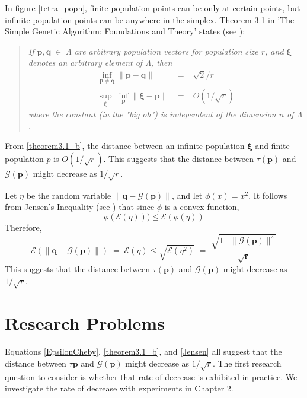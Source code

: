 In figure \ref{tetra_popn}, finite population points can be only at certain points, but infinite population points can be anywhere in the simplex. 
Theorem 3.1 in 'The Simple Genetic Algorithm: Foundations and Theory' states (see \cite{Vose1999}):  
\begin{quote}
\emph{If $\bm{p},\bm{q} \;\in\; \Lambda$ are 
arbitrary population vectors for population size $r$, and $\bm{\xi}$ denotes an arbitrary element of $\Lambda$, then 
\begin{eqnarray}
\underset{\bm{p} \neq \bm{q}}{\inf} \|\bm{p} - \bm{q}\| &\;=\;& \sqrt{2}/r    \label{theorem3.1_a} \\
\underset{\bm{\xi}}{\sup} \; \underset{\bm{p}}{\inf} \|\bm{\xi} - \bm{p}\| &\;=\;& O(1/\sqrt{r})     \label{theorem3.1_b}
\end{eqnarray}
where the constant (in the "big oh") is independent of the dimension $n$ of $\Lambda$}.
\end{quote}
From \ref{theorem3.1_b}, the distance between an infinite population $\bm{\xi}$ and finite population $p$ is $O(1/\sqrt{r})$. 
This suggests that the distance between $\tau (\bm{p})$ and $\mathcal{G}(\bm{p})$ might decrease as $1/\sqrt{r}$.

Let $\eta$ be the random variable $\| \bm{q} - \mathcal{G}(\bm{p}) \|$, and let $\phi (x) = x^2$. 
It follows from Jensen's Inequality (see \cite{JensenInequality}) that 
since $\phi$ is a convex function, 
\[
\phi(\mathcal{E}(\eta))) \leq \mathcal{E}(\phi(\eta)) 
\]
Therefore,
\begin{equation}
\label{Jensen}
\mathcal{E}(\| \bm{q} - \mathcal{G}(\bm{p}) \|) \;=\; \mathcal{E}(\eta) \leq \sqrt{\mathcal{E}(\eta^2)} \;=\; \frac{\sqrt{1 - \|\mathcal{G}(\bm{p})\|^2}}{\sqrt{\bm{r}}}
\end{equation}
This suggests that the distance between $\tau (\bm{p})$ and $\mathcal{G}(\bm{p})$ might decrease as $1/\sqrt{r}$. 

\section{Research Problems}
Equations \ref{EpsilonCheby}, \ref{theorem3.1_b}, and \ref{Jensen} all suggest that the 
distance between $\tau{\bm{p}}$ and $\mathcal{G}(\bm{p})$ might decrease as $1/\sqrt{r}$. 
The first research question to consider is whether that rate of decrease is exhibited 
in practice. We investigate the rate of decrease with experiments in Chapter 2.


